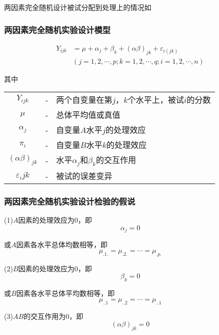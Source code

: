 两因素完全随机设计被试分配到处理上的情况如

\subsubsection{两因素完全随机实验设计模型}

\begin{definition}[两因素完全随机实验设计模型]
    \begin{align*}
        Y_{ijk} & = \mu + \alpha _j + \beta _k  + \left( \alpha \beta \right) _{jk}  + \varepsilon _{i\left( jk \right)}\\
                  & \left( j=1,2,\cdots ,p;  k=1,2,\cdots ,q;  i=1,2,\cdots ,n \right)
    \end{align*}
    
    其中
    
    {
        \renewcommand\arraystretch{1.25}
        \begin{tabular}{ccl}
            $Y_{ijk}$            & - &    两个自变量在第$j，k$个水平上，被试$i$的分数\\ 
            $\mu$                & - &    总体平均值或真值\\
            $\alpha _j$          & - &    自变量$A$水平$j$的处理效应\\
            $\pi _i$             & - &    自变量$B$水平$k$的处理效应\\
            $\left( \alpha \beta \right)_{jk}$ &-& 水平$\alpha _j$和$\beta _k$的交互作用\\
            $\varepsilon _i{jk}$  & - &   被试的误差变异
        \end{tabular}
    }  

\end{definition}

\subsubsection{两因素完全随机实验设计检验的假说}
(1)$A$因素的处理效应为0，即
\[ \alpha _j =0 \]

或$A$因素各水平总体均数相等，即
\[ \mu _{.1.} = \mu _{.2.} = \cdots = \mu _{.p.} \]


(2)$B$因素的处理效应为0，即
\[ \beta _k = 0 \]

或$B$因素各水平总体平均数相等，即
\[ \mu _{..1} = \mu _{..2} = \cdots = \mu _{..1} \]

(3)$AB$的交互作用为0，即
\[ \left( \alpha \beta \right) _{jk} = 0 \]


